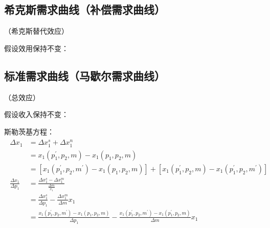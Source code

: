 \documentclass[12pt]{book}
\begin{document}
\subsection{希克斯需求曲线（补偿需求曲线）}

（希克斯替代效应）

假设效用保持不变：


\subsection{标准需求曲线（马歇尔需求曲线）}

（总效应）

假设收入保持不变：

斯勒茨基方程：
\begin{gather*}
    \begin{aligned}
    \Delta x_{1} & = \Delta x_{1}^{s} + \Delta x_{1}^{n} \\
        &= x_{1}(p^{\prime}_{1},p_{2},m) - x_{1}(p_{1},p_{2},m)\\
        &= \left[x_{1}(p^{\prime}_{1},p_{2},m^{\prime}) - x_{1}(p_{1},p_{2},m)\right] + \left[x_{1}(p_{1}^{\prime},p_{2},m) - x_{1}(p^{\prime}_{1},p_{2},m^{\prime}) \right] \\
    \frac{\Delta x_1}{\Delta p_{1}}
        &= \frac{ \Delta x_{1}^{s} - \Delta x_{1}^{m} }{ \frac{\Delta m}{x_{1}} } \\
        &= \frac{\Delta x_{1}^{s}}{\Delta p_{1}} - \frac{\Delta x_{1}^{m}}{\Delta m} x_{1} \\
        &= \frac{ x_{1}(p_{1}^{\prime},p_{2},m^{\prime})- x_{1}(p_{1},p_{2},m) }{\Delta p_{1}} - \frac{ x_{1}(p_{1}^{\prime},p_{2},m^{\prime})- x_{1}(p_{1}^{\prime},p_{2},m) }{\Delta m}x_{1}
    \end{aligned}
\end{gather*}
\end{document}
